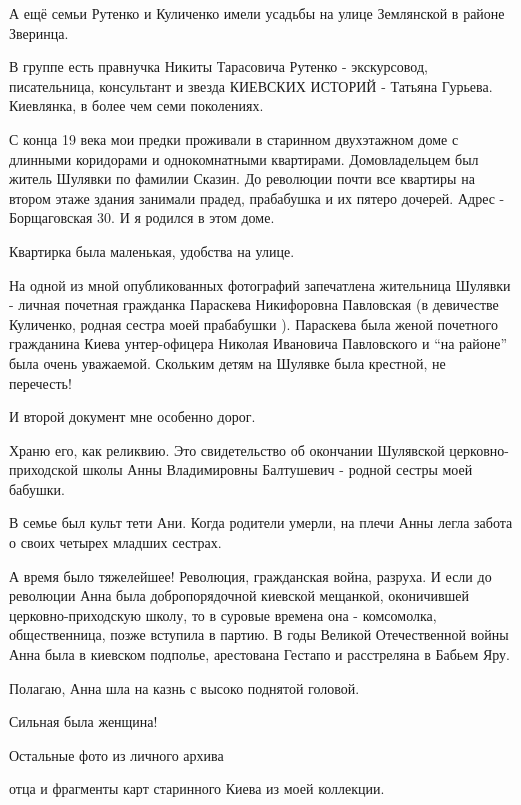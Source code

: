 А ещё семьи Рутенко и Куличенко имели усадьбы на улице Землянской в районе
Зверинца.

В группе есть правнучка Никиты Тарасовича Рутенко - экскурсовод, писательница,
консультант и звезда КИЕВСКИХ ИСТОРИЙ - Татьяна Гурьева. Киевлянка, в более чем
семи поколениях.


С конца 19 века мои предки проживали в старинном двухэтажном доме с длинными
коридорами и однокомнатными квартирами. Домовладельцем был житель Шулявки по
фамилии Сказин. До революции почти все квартиры на втором этаже здания занимали
прадед, прабабушка и их пятеро дочерей. Адрес - Борщаговская 30. И я родился в
этом доме.

Квартирка была маленькая, удобства на улице.


На одной из мной опубликованных фотографий запечатлена жительница Шулявки -
личная почетная гражданка Параскева Никифоровна Павловская (в девичестве
Куличенко, родная сестра моей прабабушки ). Параскева была женой почетного
гражданина Киева унтер-офицера Николая Ивановича Павловского и \enquote{на районе} была
очень уважаемой. Скольким детям на Шулявке была крестной, не перечесть!


И второй документ мне особенно дорог.

Храню его, как реликвию. Это свидетельство об окончании Шулявской
церковно-приходской школы Анны Владимировны Балтушевич - родной сестры моей
бабушки.

В семье был культ тети Ани. Когда родители умерли, на плечи Анны легла забота о
своих четырех  младших сестрах.

А время было тяжелейшее! Революция, гражданская война, разруха. И если  до
революции Анна была добропорядочной киевской мещанкой, оконичившей
церковно-приходскую школу, то в суровые времена она - комсомолка,
общественница, позже вступила в партию. В годы Великой Отечественной войны Анна
была в киевском подполье, арестована Гестапо и расстреляна в Бабьем Яру. 

Полагаю, Анна шла на казнь с высоко поднятой головой. 

Сильная была женщина!

Остальные фото из личного архива 

отца и фрагменты карт старинного Киева из моей коллекции.

